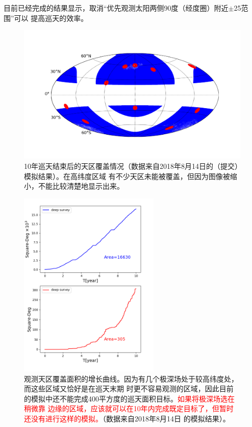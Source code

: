 \documentclass[a4paper,11pt]{ctexart}
\newcommand{\RT}[1]{\textcolor{red}{#1}}
\begin{document}
目前已经完成的结果显示，取消“优先观测太阳两侧90度（经度圈）附近$\pm$25\textdegree 范围”可以
提高巡天的效率。

\begin{figure}[h!]
\centering
\includegraphics[width=1.3\textwidth,angle=-90]{figures/covered_sky_0814_test-A.png}
\caption{10年巡天结束后的天区覆盖情况（数据来自2018年8月14日的（提交）模拟结果）。在高纬度区域
有不少天区未能被覆盖，但因为图像被缩小，不能比较清楚地显示出来。}
\label{fig:covered_sky_0814}
\end{figure}

\begin{figure}[h!]
\centering
\includegraphics[width=0.6\textwidth]{figures/area_E20_b17_0814.png}
\caption{观测天区覆盖面积的增长曲线。因为有几个极深场处于较高纬度处，而这些区域又恰好是在巡天末期
时更不容易观测的区域，因此目前的模拟中还不能完成400平方度的巡天面积目标。\RT{如果将极深场选在稍微靠
边缘的区域，应该就可以在10年内完成既定目标了，但暂时还没有进行这样的模拟。}（数据来自2018年8月14日
的模拟结果）。}
\label{fig:area_growth_0804}
\end{figure}
\end{document}
